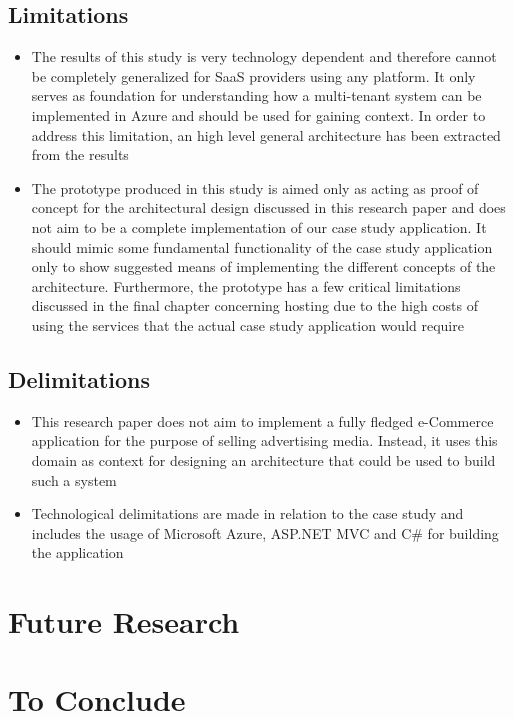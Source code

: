\subsection{Limitations}
\begin{itemize}
\item The results of this study is very technology dependent and therefore cannot be completely generalized for SaaS providers using any platform. It only serves as foundation for understanding how a multi-tenant system can be implemented in Azure and should be used for gaining context. In order to address this limitation, an high level general architecture has been extracted from the results
\item The prototype produced in this study is aimed only as acting as proof of concept for the architectural design discussed in this research paper and does not aim to be a complete implementation of our case study application. It should mimic some fundamental functionality of the case study application only to show suggested means of implementing the different concepts of the architecture. Furthermore, the prototype has a few critical limitations discussed in the final chapter concerning hosting due to the high costs of using the services that the actual case study application would require
\end{itemize}

\subsection{Delimitations}
\begin{itemize}
\item This research paper does not aim to implement a fully fledged e-Commerce application for the purpose of selling advertising media. Instead, it uses this domain as context for designing an architecture that could be used to build such a system
\item Technological delimitations are made in relation to the case study and includes the usage of Microsoft Azure, ASP.NET MVC and C\# for building the application
\end{itemize}

\section{Future Research}

\section{To Conclude}

